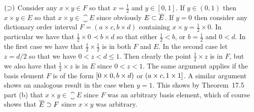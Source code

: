 {{    $(\supset)$ Consider any $x \times y \in F$ so that $x = \tfrac{1}{2}$ and $y \in [0,1]$.
    If $y \in (0,1)$ then $x \times y \in E$ so that $x \times y \in \closure{E}$ since obviously $E \subset \overline{E}$.
    If $y = 0$ then consider any dictionary order interval $F = (a \times c, b \times d)$ containing $x \times y = \tfrac{1}{2} \times 0$.
    In particular we have that $\tfrac{1}{2} \times 0 \prec b \times d$ so that either $\tfrac{1}{2} < b$, or $b = \tfrac{1}{2}$ and $0 < d$.
    In the first case we have that $\tfrac{1}{2} \times \tfrac{1}{2}$ is in both $F$ and $E$.
    In the second case let $z = d/2$ so that we have $0 < z < d \leq 1$.
    Then clearly the point $\tfrac{1}{2} \times z$ is in $F$, but we also have that $\tfrac{1}{2} \times z$ is in $E$ since $0 < z < 1$.
    The same argument applies if the basis element $F$ is of the form $[0 \times 0, b \times d)$ or $(a \times c, 1 \times 1]$.
    A similar argument shows an analogous result in the case when $y = 1$.
    This shows by Theorem~17.5 part (b) that $x \times y \in \closure{E}$ since $F$ was an arbitrary basis element, which of course shows that $\overline{E} \supset F$ since $x \times y$ was arbitrary.
  }
}

